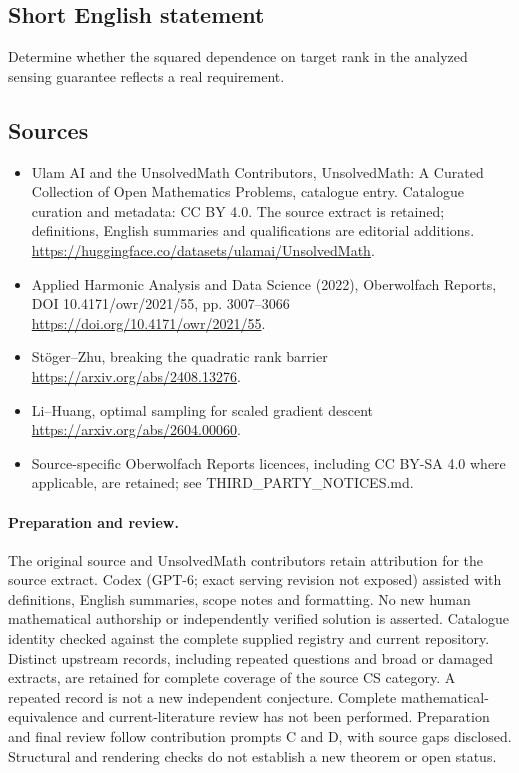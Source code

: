 \documentclass[11pt]{article}
\begin{document}
\subsection{Short English statement}
Determine whether the squared dependence on target rank in the analyzed sensing guarantee reflects a real requirement.
\subsection{Sources}
\begin{itemize}
\item[\hypertarget{source:statement:1}{S1}] Ulam AI and the UnsolvedMath Contributors, UnsolvedMath: A Curated Collection of Open Mathematics Problems, catalogue entry. Catalogue curation and metadata: CC BY 4.0. The source extract is retained; definitions, English summaries and qualifications are editorial additions.
\url{https://huggingface.co/datasets/ulamai/UnsolvedMath}.
\item[\hypertarget{source:statement:2}{S2}] Applied Harmonic Analysis and Data Science (2022), Oberwolfach Reports, DOI 10.4171/owr/2021/55, pp. 3007--3066
\url{https://doi.org/10.4171/owr/2021/55}.
\item[\hypertarget{source:statement:3}{S3}] Stöger--Zhu, breaking the quadratic rank barrier
\url{https://arxiv.org/abs/2408.13276}.
\item[\hypertarget{source:statement:4}{S4}] Li--Huang, optimal sampling for scaled gradient descent
\url{https://arxiv.org/abs/2604.00060}.
\item Source-specific Oberwolfach Reports licences, including CC BY-SA 4.0 where applicable, are retained; see THIRD\_PARTY\_NOTICES.md.
\end{itemize}
\paragraph{Preparation and review.}
The original source and UnsolvedMath contributors retain attribution for the source extract. Codex (GPT-6; exact serving revision not exposed) assisted with definitions, English summaries, scope notes and formatting. No new human mathematical authorship or independently verified solution is asserted. Catalogue identity checked against the complete supplied registry and current repository. Distinct upstream records, including repeated questions and broad or damaged extracts, are retained for complete coverage of the source CS category. A repeated record is not a new independent conjecture. Complete mathematical-equivalence and current-literature review has not been performed. Preparation and final review follow contribution prompts C and D, with source gaps disclosed. Structural and rendering checks do not establish a new theorem or open status.
\label{end:statement}
\end{document}
